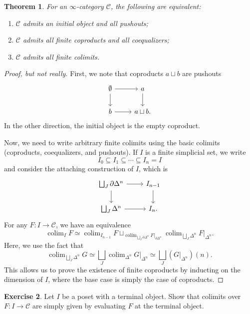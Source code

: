 \documentclass[10pt]{amsart}
\newtheorem{thm}{Theorem}[subsection]
\theoremstyle{definition}
\newtheorem{exer}[thm]{Exercise}
\theoremstyle{remark}
\theoremstyle{plain}
\theoremstyle{definition}
\theoremstyle{remark}
\newcommand{\mc}[1]{\mathcal{#1}}
\newcommand{\1}{\mathbf{1}}
\newcommand{\2}{\mathbf{2}}
\newcommand{\3}{\mathbf{3}}
\DeclareMathOperator*{\colim}{colim}
\begin{document}
\begin{thm}
    For an $\infty$-category $\mc{C}$, the following are equivalent:
    \begin{enumerate}
        \item $\mc{C}$ admits an initial object and all pushouts;
        \item $\mc{C}$ admits all finite coproducts and all coequalizers;
        \item $\mc{C}$ admits all finite colimits.
    \end{enumerate}
\end{thm}

\begin{proof}[Proof, but not really]
    First, we note that coproducts $a \sqcup b$ are pushouts
    \begin{equation*}
    \begin{tikzcd}
        \emptyset \ar{r} \ar{d} & a \ar{d} \\
        b \ar{r} & a \sqcup b.
    \end{tikzcd}
    \end{equation*}
    In the other direction, the initial object is the empty coproduct.

    Now, we need to write arbitrary finite colimits using the basic colimits (coproducts, coequalizers, and pushouts). If $I$ is a finite simplicial set, we write
    \[ I_0 \subseteq I_1 \subseteq \cdots \subseteq I_n = I \]
    and consider the attaching construction of $I$, which is
    \begin{equation*}
    \begin{tikzcd}
        \bigsqcup_J \partial \Delta^n \ar{r} \ar{d} & I_{n-1} \ar{d} \\
        \bigsqcup_J \Delta^n \ar{r} & I_n.
    \end{tikzcd}
    \end{equation*}
    For any $F \colon I \to \mc{C}$, we have an equivalence
    \[ \colim_I F \simeq \colim_{I_{n-1}} F \sqcup_{\colim_{\bigsqcup_J \partial \Delta^n} F|_{\partial \Delta^n}} \colim_{\bigsqcup_J \Delta^n} F|_{\Delta^n}. \]
    Here, we use the fact that
    \[ \colim_{\bigsqcup_J \Delta^n} G \simeq \bigsqcup_J \colim_{\Delta^n} G|_{\Delta^n} \simeq \bigsqcup_J (G|_{\Delta^n})(n). \]
    This allows us to prove the existence of finite coproducts by inducting on the dimension of $I$, where the base case is simply the case of coproducts.
\end{proof}

\begin{exer}
    Let $I$ be a poset with a terminal object. Show that colimits over $F \colon I \to \mc{C}$ are simply given by evaluating $F$ at the terminal object.
\end{exer}
\end{document}
